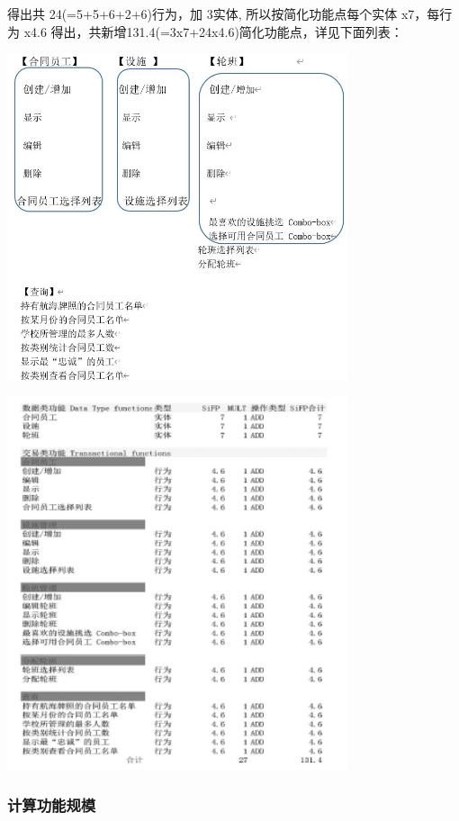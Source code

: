 得出共 24(=5+5+6+2+6)行为，加 3实体, 所以按简化功能点每个实体 x7，每行为
x4.6 得出，共新增131.4(=3x7+24x4.6)简化功能点，详见下面列表：



\includegraphics[width=10cm]{Ex1SoluScreenshot_2022-04-05_115926.jpg}


\includegraphics[width=10cm]{微信截图_20230324091110.png}

\hypertarget{ux8ba1ux7b97ux529fux80fdux89c4ux6a21}{%
\subsubsection{计算功能规模}\label{ux8ba1ux7b97ux529fux80fdux89c4ux6a21}}

